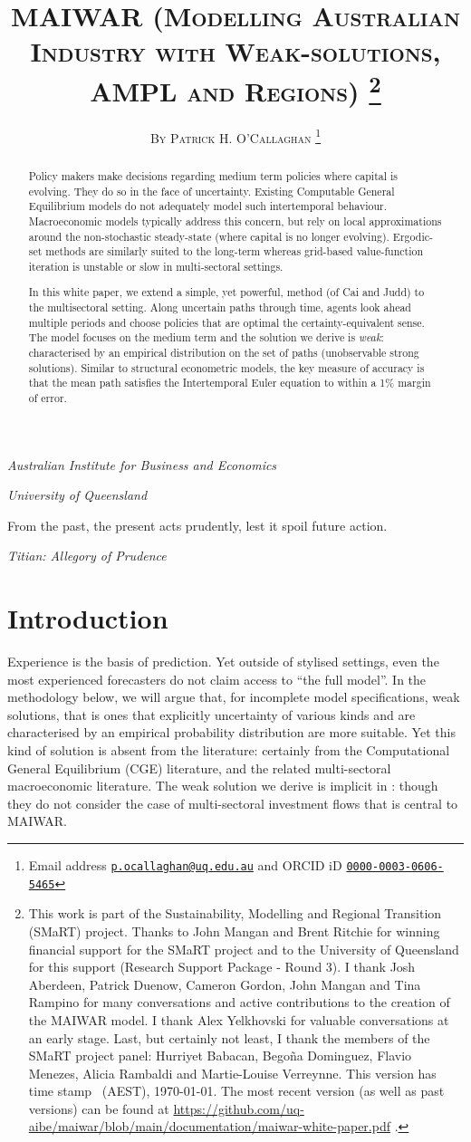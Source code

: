 \documentclass[12pt,a4paper,twoside, draft]{article}
\title{
   \textsc{
MAIWAR (Modelling Australian Industry with Weak-solutions, AMPL and Regions)
}
\footnote{
      This work is part of the Sustainability, Modelling and Regional
      Transition (SMaRT) project.
      Thanks to John Mangan and Brent Ritchie for winning financial support for
      the SMaRT project and to the University of Queensland for this support
      (Research Support Package - Round 3).
      I thank Josh Aberdeen, Patrick Duenow, Cameron Gordon, John Mangan and
      Tina Rampino for many conversations and active contributions to the
      creation of the MAIWAR model.
      I thank Alex Yelkhovski for valuable conversations at an early stage. 
      Last, but certainly not least, I thank the members of the SMaRT project
      panel: Hurriyet Babacan, Bego\~{n}a Dominguez, Flavio Menezes, Alicia
      Rambaldi and Martie-Louise Verreynne.
      This version has time stamp \currenttime~(AEST), \today. The most recent
      version (as well as past versions) can be found at
      \url{https://github.com/uq-aibe/maiwar/blob/main/documentation/maiwar-white-paper.pdf} .}}
\author{\large\textsc{By Patrick H. O'Callaghan}
   \footnote{Email address
    \href{mailto:p.ocallaghan@uq.edu.au}{\texttt{p.ocallaghan@uq.edu.au}} and
    ORCID iD \href{http://orcid.org/0000-0003-0606-5465}{
      \texttt{0000-0003-0606-5465}} }}
\date{}
\makeatletter
\renewcommand\maketitle
  {\begin{center}\mdseries\large
    {\@title}%
    \par\medskip\medskip
    {\normalsize\@author}%
    \par\medskip\medskip\normalfont
    \begin{small}
\emph{Australian Institute for Business and Economics}
\end{small}
\par
\begin{small}
\emph{University of Queensland}
\end{small}
   \end{center}
  }
\makeatother
\begin{document}
  \maketitle

  \pagestyle{fancy}
\renewcommand{\abstractname}{\vspace{-\baselineskip}} \thispagestyle{plain}
%

\begin{abstract}%
  
  Policy makers make decisions regarding medium term policies where capital is
  evolving.
  They do so in the face of uncertainty.
  Existing Computable General Equilibrium models do not adequately model
  such intertemporal behaviour.
  Macroeconomic models typically address this concern, but
  rely on local approximations around the non-stochastic steady-state
  (where capital is no longer evolving). Ergodic-set methods are similarly
  suited to the long-term whereas grid-based value-function iteration is
  unstable or slow in multi-sectoral settings.
  
  In this white paper, we extend a simple, yet powerful, method (of Cai and
  Judd) to the multisectoral setting. Along uncertain paths through time,
  agents look ahead multiple periods and choose policies that are optimal the
  certainty-equivalent sense. 
  The model focuses on the medium term and the solution we derive is
  \emph{weak}: characterised by an empirical distribution on the set of
  paths (unobservable strong solutions).
  Similar to structural econometric models, the key measure of accuracy is that
  the mean path satisfies the Intertemporal Euler equation to within a 1\%
  margin of error.
\end{abstract}
\setlength{\epigraphwidth}{11.5cm}
\epigraph{
   From the past, the present acts prudently, lest it spoil future action.
  }{\emph{Titian:  Allegory of Prudence}
}

\section{Introduction}\label{sec-introduction}
Experience is the basis of prediction.  Yet outside of stylised settings, even
the most experienced forecasters do not claim  access to ``the full
model''.
In the methodology below, we will argue that, for incomplete model
specifications, weak solutions, that is ones that explicitly uncertainty of
various kinds and are characterised by an empirical probability distribution
are more suitable.
Yet this kind of solution is absent from the literature: certainly from
the Computational General Equilibrium (CGE) literature, and the related
multi-sectoral macroeconomic literature.
The weak solution we derive is implicit in \citet{CJ}: though they do not
consider the case of multi-sectoral investment flows that is central to MAIWAR.
\end{document}
